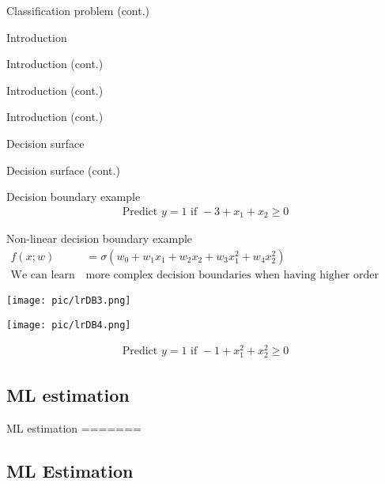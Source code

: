 \documentclass[serif, aspectratio=169]{beamer}
\begin{document}
\begin{frame}{Classification problem (cont.)}
\begin{itemize}
\begin{frame}{Introduction}
\begin{itemize}
\begin{frame}{Introduction (cont.)}
\begin{frame}{Introduction (cont.)}
\begin{frame}{Introduction (cont.)}
\begin{frame}{Decision surface}
\begin{itemize}
\begin{frame}{Decision surface (cont.)}
\begin{frame}{Decision boundary example}
    \begin{align*}
        \text{Predict } y=1 \text{ if } -3 + x_1 + x_2 \geq 0
    \end{align*}
    
\end{frame}
\begin{frame}{Non-linear decision boundary example}
    \begin{align*}
        f(x;w) &= \sigma (w_0 + w_1 x_1 + w_2 x_2 + w_3x_1^2 + w_4x_2^2) \\
        \text{We can learn } & \text{more complex decision boundaries when having higher order terms}
    \end{align*}
    
    \begin{minipage}{0.30\linewidth}
        \centering
        \texttt{[image: pic/lrDB3.png]}
    \end{minipage}
    \hfill
    \begin{minipage}{0.30\linewidth}
        \centering
        \texttt{[image: pic/lrDB4.png]}
    \end{minipage}
    
    \begin{align*}
        \text{Predict } y=1 \text{ if } -1 + x_1^2 + x_2^2 \geq 0
    \end{align*}
    
\end{frame}
\subsection{ML estimation}

\begin{frame}{ML estimation}
=======

\subsection{ML Estimation}


\end{frame}
\end{frame}
\end{itemize}
\end{frame}
\end{frame}
\end{frame}
\end{frame}
\end{itemize}
\end{frame}
\end{itemize}
\end{frame}
\end{document}
